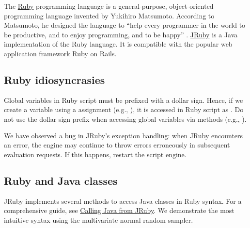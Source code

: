 The \href{https://www.ruby-lang.org}{Ruby} programming language is a general-purpose, object-oriented programming language invented by Yukihiro Matsumoto. According to Matsumoto, he designed the language to ``help every programmer in the world to be productive, and to enjoy programming, and to be happy'' \citep{rubyvideo}. \href{http://jruby.org/}{JRuby} is a Java implementation of the Ruby language. It is compatible with the popular web application framework \href{http://rubyonrails.org/}{Ruby on Rails}.

\subsection{Ruby idiosyncrasies}

Global variables in Ruby script must be prefixed with a dollar sign. Hence, if we create a variable  using a  assignment (e.g., ), it is accessed in Ruby script as . Do not use the dollar sign prefix when accessing global variables via  methods (e.g., ).

We have observed a bug in JRuby's exception handling: when JRuby encounters an error, the engine may continue to throw errors erroneously in subsequent evaluation requests. If this happens, restart the script engine.

\subsection{Ruby and Java classes}

JRuby implements several methods to access Java classes in Ruby syntax. For a comprehensive guide, see \href{https://github.com/jruby/jruby/wiki/CallingJavaFromJRuby}{Calling Java from JRuby}. We demonstrate the most intuitive syntax using the multivariate normal random sampler.

